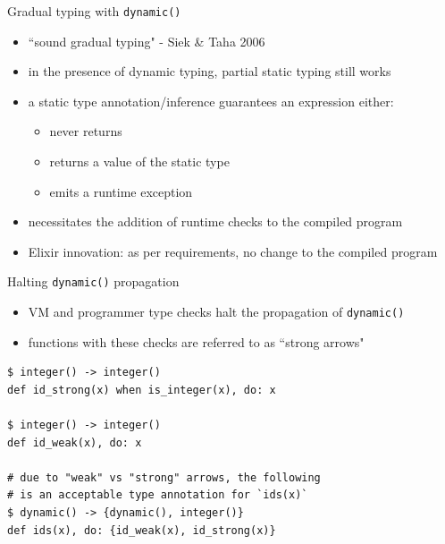 \documentclass[
  ignorenonframetext,
  aspectratio=169]{beamer}
\newcommand{\passthrough}[1]{#1}
\providecommand{\tightlist}{%
  \setlength{\itemsep}{0pt}\setlength{\parskip}{0pt}}
\begin{document}
\begin{frame}{Gradual typing with \passthrough{\lstinline!dynamic()!}}
\label{gradual-typing-with-dynamic-1}
\begin{itemize}
\tightlist
\item
  ``sound gradual typing" - Siek \& Taha 2006
\item
  in the presence of dynamic typing, partial static typing still works
\item
  a static type annotation/inference guarantees an expression either:

  \begin{itemize}
  \tightlist
  \item
    never returns
  \item
    returns a value of the static type
  \item
    emits a runtime exception
  \end{itemize}
\item
  necessitates the addition of runtime checks to the compiled program
\item
  Elixir innovation: as per requirements, no change to the compiled
  program
\end{itemize}
\end{frame}

\begin{frame}[fragile]{Halting \passthrough{\lstinline!dynamic()!}
propagation}
\label{halting-dynamic-propagation}
\begin{itemize}
\tightlist
\item
  VM and programmer type checks halt the propagation of
  \passthrough{\lstinline!dynamic()!}
\item
  functions with these checks are referred to as ``strong arrows"
\end{itemize}

\begin{lstlisting}
$ integer() -> integer()
def id_strong(x) when is_integer(x), do: x

$ integer() -> integer()
def id_weak(x), do: x

# due to "weak" vs "strong" arrows, the following
# is an acceptable type annotation for `ids(x)`
$ dynamic() -> {dynamic(), integer()}
def ids(x), do: {id_weak(x), id_strong(x)}
\end{lstlisting}
\end{frame}
\end{document}
